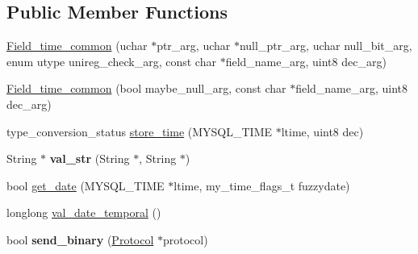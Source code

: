 \subsection*{Public Member Functions}
\begin{DoxyCompactItemize}
\item 
\mbox{\hyperlink{classField__time__common_a4dafe0dc9d97419ac274303c339bff04}{Field\+\_\+time\+\_\+common}} (uchar $\ast$ptr\+\_\+arg, uchar $\ast$null\+\_\+ptr\+\_\+arg, uchar null\+\_\+bit\+\_\+arg, enum utype unireg\+\_\+check\+\_\+arg, const char $\ast$field\+\_\+name\+\_\+arg, uint8 dec\+\_\+arg)
\item 
\mbox{\hyperlink{classField__time__common_a892bfdd20ae6cc742a79914c12201695}{Field\+\_\+time\+\_\+common}} (bool maybe\+\_\+null\+\_\+arg, const char $\ast$field\+\_\+name\+\_\+arg, uint8 dec\+\_\+arg)
\item 
type\+\_\+conversion\+\_\+status \mbox{\hyperlink{classField__time__common_a679289fc41b3c0f5bf4f20a31d0e67d3}{store\+\_\+time}} (M\+Y\+S\+Q\+L\+\_\+\+T\+I\+ME $\ast$ltime, uint8 dec)
\item 
\mbox{\label{classField__time__common_ae1ce0b39f440d13ccf0c9542dffe0aaa}} 
String $\ast$ {\bfseries val\+\_\+str} (String $\ast$, String $\ast$)
\item 
bool \mbox{\hyperlink{classField__time__common_afc75d14f8d4b343aff26653839f08466}{get\+\_\+date}} (M\+Y\+S\+Q\+L\+\_\+\+T\+I\+ME $\ast$ltime, my\+\_\+time\+\_\+flags\+\_\+t fuzzydate)
\item 
longlong \mbox{\hyperlink{classField__time__common_a78d985bb5c8a86a8860bff1315839c10}{val\+\_\+date\+\_\+temporal}} ()
\item 
\mbox{\label{classField__time__common_abad8d0f8e8633479aee82d9c371bc286}} 
bool {\bfseries send\+\_\+binary} (\mbox{\hyperlink{classProtocol}{Protocol}} $\ast$protocol)
\end{DoxyCompactItemize}

